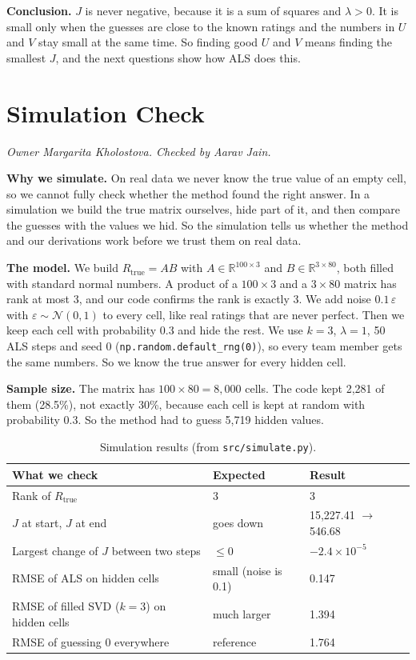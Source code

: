 \textbf{Conclusion.} $J$ is never negative, because it is a sum of squares and $\lambda > 0$. It is small only when the guesses are close to the known ratings and the numbers in $U$ and $V$ stay small at the same time. So finding good $U$ and $V$ means finding the smallest $J$, and the next questions show how ALS does this.

\section{Simulation Check}
\textit{Owner Margarita Kholostova. Checked by Aarav Jain.}

\textbf{Why we simulate.} On real data we never know the true value of an empty cell, so we cannot fully check whether the method found the right answer. In a simulation we build the true matrix ourselves, hide part of it, and then compare the guesses with the values we hid. So the simulation tells us whether the method and our derivations work before we trust them on real data.

\textbf{The model.} We build $R_{\text{true}} = AB$ with $A \in \mathbb{R}^{100\times 3}$ and $B \in \mathbb{R}^{3\times 80}$, both filled with standard normal numbers. A product of a $100\times3$ and a $3\times80$ matrix has rank at most 3, and our code confirms the rank is exactly 3. We add noise $0.1\,\varepsilon$ with $\varepsilon \sim \mathcal N(0,1)$ to every cell, like real ratings that are never perfect. Then we keep each cell with probability 0.3 and hide the rest. We use $k = 3$, $\lambda = 1$, 50 ALS steps and seed 0 (\texttt{np.random.default\_rng(0)}), so every team member gets the same numbers. So we know the true answer for every hidden cell.

\textbf{Sample size.} The matrix has $100 \times 80 = 8{,}000$ cells. The code kept 2{,}281 of them (28.5\%), not exactly 30\%, because each cell is kept at random with probability 0.3. So the method had to guess 5{,}719 hidden values.

\begin{table}[h]
\centering
\begin{tabular}{lll}
\hline
What we check & Expected & Result \\
\hline
Rank of $R_{\text{true}}$ & 3 & 3 \\
$J$ at start, $J$ at end & goes down & 15{,}227.41 $\to$ 546.68 \\
Largest change of $J$ between two steps & $\le 0$ & $-2.4\times10^{-5}$ \\
RMSE of ALS on hidden cells & small (noise is 0.1) & 0.147 \\
RMSE of filled SVD ($k=3$) on hidden cells & much larger & 1.394 \\
RMSE of guessing 0 everywhere & reference & 1.764 \\
\hline
\end{tabular}
\caption{Simulation results (from \texttt{src/simulate.py}).}
\label{tab:sim}
\end{table}

